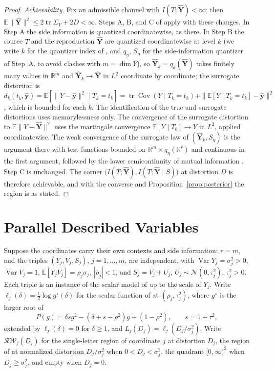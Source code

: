 \documentclass[11pt,onecolumn]{IEEEtran}
\newcommand{\E}{\mathbb{E}}
\newcommand{\R}{\mathbb{R}}
\newcommand{\tr}{\operatorname{tr}}
\newcommand{\Cov}{\operatorname{Cov}}
\newcommand{\hYv}{\hat{\mathbf Y}}
\newcommand{\RW}{\mathcal{R}\!\mathcal{W}}
\begin{document}
\begin{proof}
\emph{Achievability.} Fix an admissible channel with
$I(T;\hYv)<\infty$; then $\E\|\hYv\|^2\le2\tr\Sigma_Y+2D<\infty$. Steps A,
B, and C of \cite[Theorem~29]{bond2026tit} apply with these changes. In
Step A the side information is quantized coordinatewise, as there. In
Step B the source $T$ and the reproduction $\hYv$ are quantized
coordinatewise at level $k$ (we write $k$ for the quantizer index of
\cite[Theorem~29, Step~B]{bond2026tit}, and $q_\eta$, $S_\eta$ for the
side-information quantizer of Step~A, to avoid clashes with $m=\dim Y$),
so $\hYv_k=q_k(\hYv)$ takes finitely many values in $\R^m$ and
$\hYv_k\to\hYv$ in $L^2$ coordinate by coordinate; the surrogate distortion
is
$d_k(t_k,\hat{\mathbf y})=\E[\|Y-\hat{\mathbf y}\|^2\mid T_k=t_k]
=\tr\Cov(Y\mid T_k=t_k)+\|\E[Y\mid T_k=t_k]-\hat{\mathbf y}\|^2$, which is
bounded for each $k$. The identification of the true and surrogate
distortions uses memorylessness only. The convergence of the surrogate
distortion to $\E\|Y-\hYv\|^2$ uses the martingale convergence
$\E[Y\mid T_k]\to Y$ in $L^2$, applied coordinatewise. The weak
convergence of the surrogate law of $(\hYv_k,S_\eta)$ is the argument
there with test functions bounded on $\R^m\times q_\eta(\R^r)$ and
continuous in the first argument, followed by the lower semicontinuity of
mutual information \cite{posner1975}. Step C is unchanged. The
corner $\bigl(I(T;\hYv),I(T;\hYv\mid S)\bigr)$ at distortion $D$ is
therefore achievable, and with the converse and
Proposition~\ref{prop:posterior} the region is as stated.
\end{proof}

\section{Parallel Described Variables}
\label{sec:parallel}

Suppose the coordinates carry their own contexts and side information:
$r=m$, and the triples $(Y_j,V_j,S_j)$, $j=1,\dots,m$, are independent,
with $\operatorname{Var}Y_j=\sigma_j^2>0$, $\operatorname{Var}V_j=1$,
$\E[Y_jV_j]=\rho_j\sigma_j$, $|\rho_j|<1$, and $S_j=V_j+U_j$,
$U_j\sim\mathcal N(0,\tau_j^2)$, $\tau_j^2>0$. Each triple is an instance
of the scalar model of \cite{bond2026tit} up to the scale of $Y_j$. Write
$\ell_j(\delta)=\tfrac12\log g^\star(\delta)$ for the scalar function of
\cite[Theorem~14(a)]{bond2026tit} at $(\rho_j,\tau_j^2)$, where
$g^\star$ is the larger root of
\[
P(g)=\delta sg^2-(\delta+s-\rho^2)g+(1-\rho^2),\qquad s=1+\tau^2,
\]
extended by $\ell_j(\delta)=0$ for $\delta\ge1$, and
$L_j(D_j)=\ell_j(D_j/\sigma_j^2)$. Write $\RW_j(D_j)$ for the
single-letter region of coordinate $j$ at distortion $D_j$, the region
of \cite[Theorem~14(b)]{bond2026tit} at normalized distortion
$D_j/\sigma_j^2$ when $0<D_j<\sigma_j^2$, the quadrant $[0,\infty)^2$
when $D_j\ge\sigma_j^2$, and empty when $D_j=0$.
\end{document}
